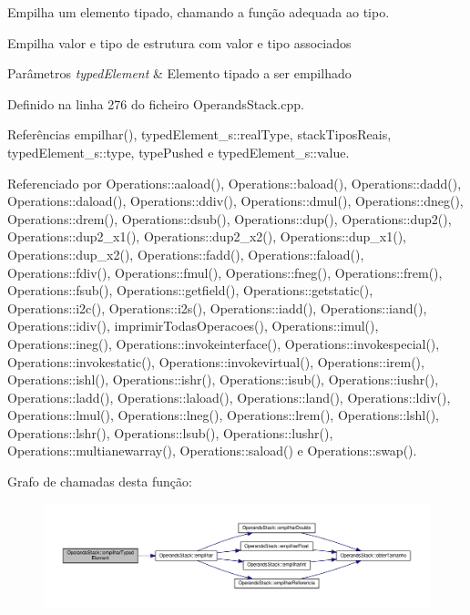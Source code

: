 Empilha um elemento tipado, chamando a função adequada ao tipo. 

Empilha valor e tipo de estrutura com valor e tipo associados


\begin{DoxyParams}{Parâmetros}
{\em typed\+Element} & Elemento tipado a ser empilhado \\
\hline
\end{DoxyParams}


Definido na linha 276 do ficheiro Operands\+Stack.\+cpp.



Referências empilhar(), typed\+Element\+\_\+s\+::real\+Type, stack\+Tipos\+Reais, typed\+Element\+\_\+s\+::type, type\+Pushed e typed\+Element\+\_\+s\+::value.



Referenciado por Operations\+::aaload(), Operations\+::baload(), Operations\+::dadd(), Operations\+::daload(), Operations\+::ddiv(), Operations\+::dmul(), Operations\+::dneg(), Operations\+::drem(), Operations\+::dsub(), Operations\+::dup(), Operations\+::dup2(), Operations\+::dup2\+\_\+x1(), Operations\+::dup2\+\_\+x2(), Operations\+::dup\+\_\+x1(), Operations\+::dup\+\_\+x2(), Operations\+::fadd(), Operations\+::faload(), Operations\+::fdiv(), Operations\+::fmul(), Operations\+::fneg(), Operations\+::frem(), Operations\+::fsub(), Operations\+::getfield(), Operations\+::getstatic(), Operations\+::i2c(), Operations\+::i2s(), Operations\+::iadd(), Operations\+::iand(), Operations\+::idiv(), imprimir\+Todas\+Operacoes(), Operations\+::imul(), Operations\+::ineg(), Operations\+::invokeinterface(), Operations\+::invokespecial(), Operations\+::invokestatic(), Operations\+::invokevirtual(), Operations\+::irem(), Operations\+::ishl(), Operations\+::ishr(), Operations\+::isub(), Operations\+::iushr(), Operations\+::ladd(), Operations\+::laload(), Operations\+::land(), Operations\+::ldiv(), Operations\+::lmul(), Operations\+::lneg(), Operations\+::lrem(), Operations\+::lshl(), Operations\+::lshr(), Operations\+::lsub(), Operations\+::lushr(), Operations\+::multianewarray(), Operations\+::saload() e Operations\+::swap().

Grafo de chamadas desta função\+:
\nopagebreak
\begin{figure}[H]
\begin{center}
\leavevmode
\includegraphics[width=350pt]{classOperandsStack_a73960b4536c99847bf4545a45f04f089_cgraph}
\end{center}
\end{figure}
\mbox{\label{classOperandsStack_aa6dbee87661011453ba2c57405bd9a4e}} 
